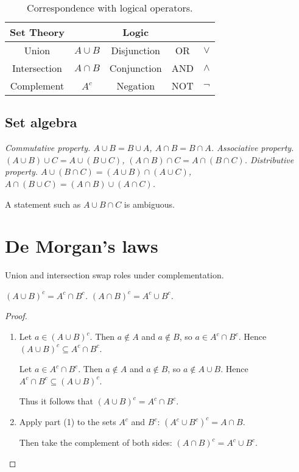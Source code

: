 \begin{table}
\centering
\caption{Correspondence with logical operators.}
\begin{tabular}{|c|c||c|c|c|} \hline
Set Theory 		& 			& Logic			&		& \\ \hline
Union			& $A\cup B$	& Disjunction 	& OR 	& $\lor$	\\
Intersection		& $A\cap B$	& Conjunction	& AND 	& $\land$\\
Complement		& $A^c$		& Negation		& NOT 	& $\lnot$	\\ \hline
\end{tabular}
\end{table}

\subsection{Set algebra}
\begin{definition}
\ben
\it Commutative property.
\bit 
\it $A\cup B = B\cup A$,
\it $A\cap B = B\cap A$.
\eit
\it Associative property.
\bit 
\it $(A\cup B)\cup C = A\cup (B\cup C)$,
\it $(A\cap B)\cap C = A\cap (B\cap C)$.
\eit
\it Distributive property.
\bit 
\it $A\cup (B\cap C) = (A\cup B)\cap(A\cup C)$,
\it $A\cap (B\cup C) = (A\cap B)\cup(A\cap C)$.
\eit
\een
\end{definition}

\begin{remark}
A statement such as $A\cup B\cap C$ is ambiguous. 
\end{remark}

\section{De Morgan's laws}
Union and intersection swap roles under complementation.

\begin{theorem}\label{thm:demorgan_simple}
\ben
\it $(A\cup B)^c = A^c\cap B^c$.
\it $(A\cap B)^c = A^c\cup B^c$.
\een
\end{theorem}

\begin{proof}
\begin{enumerate}
\item %
Let $a\in(A\cup B)^c$. Then $a\notin A$ and $a\notin B$, so $a\in A^c\cap B^c$.
Hence $(A\cup B)^c\subseteq A^c\cap B^c$.\par
Let $a\in A^c\cap B^c$. Then $a\notin A$ and $a\notin B$, so $a\notin A\cup B$.
Hence $A^c\cap B^c\subseteq (A\cup B)^c$.\par
Thus it follows that $(A\cup B)^c = A^c\cap B^c$.
\item %
Apply part (1) to the sets $A^c$ and $B^c$: $(A^c\cup B^c)^c = A\cap B$.\par
Then take the complement of both sides: $(A\cap B)^c = A^c\cup B^c$.
\end{enumerate}
\end{proof}

